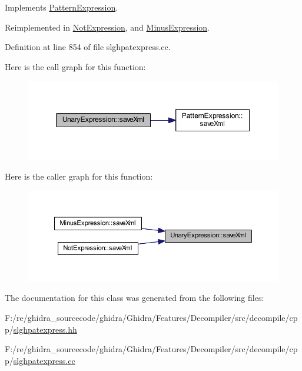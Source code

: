 Implements \mbox{\hyperlink{class_pattern_expression_a0d9c89ffbf4a22fac68189a845cde92a}{Pattern\+Expression}}.



Reimplemented in \mbox{\hyperlink{class_not_expression_aa0d7fd2da95e71dfe35664328b219ebb}{Not\+Expression}}, and \mbox{\hyperlink{class_minus_expression_a3edf1546b4d4161e68ed8151654a9b9b}{Minus\+Expression}}.



Definition at line 854 of file slghpatexpress.\+cc.

Here is the call graph for this function\+:
\nopagebreak
\begin{figure}[H]
\begin{center}
\leavevmode
\includegraphics[width=350pt]{class_unary_expression_a8b6b833f511d84b606baf8233d271255_cgraph}
\end{center}
\end{figure}
Here is the caller graph for this function\+:
\nopagebreak
\begin{figure}[H]
\begin{center}
\leavevmode
\includegraphics[width=350pt]{class_unary_expression_a8b6b833f511d84b606baf8233d271255_icgraph}
\end{center}
\end{figure}


The documentation for this class was generated from the following files\+:\begin{DoxyCompactItemize}
\item 
F\+:/re/ghidra\+\_\+sourcecode/ghidra/\+Ghidra/\+Features/\+Decompiler/src/decompile/cpp/\mbox{\hyperlink{slghpatexpress_8hh}{slghpatexpress.\+hh}}\item 
F\+:/re/ghidra\+\_\+sourcecode/ghidra/\+Ghidra/\+Features/\+Decompiler/src/decompile/cpp/\mbox{\hyperlink{slghpatexpress_8cc}{slghpatexpress.\+cc}}\end{DoxyCompactItemize}
